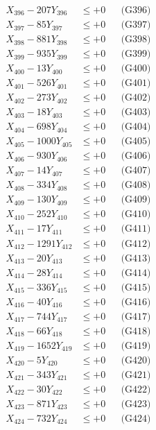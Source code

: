 \documentclass[a4paper,10pt]{article}
\begin{document}
{\begin{align}
X_{396} - 207Y_{396} &\leq +0 && \text{(G396)} \\
X_{397} - 85Y_{397} &\leq +0 && \text{(G397)} \\
X_{398} - 881Y_{398} &\leq +0 && \text{(G398)} \\
X_{399} - 935Y_{399} &\leq +0 && \text{(G399)} \\
X_{400} - 13Y_{400} &\leq +0 && \text{(G400)} \\
\allowbreak
X_{401} - 526Y_{401} &\leq +0 && \text{(G401)} \\
X_{402} - 273Y_{402} &\leq +0 && \text{(G402)} \\
X_{403} - 18Y_{403} &\leq +0 && \text{(G403)} \\
X_{404} - 698Y_{404} &\leq +0 && \text{(G404)} \\
X_{405} - 1000Y_{405} &\leq +0 && \text{(G405)} \\
X_{406} - 930Y_{406} &\leq +0 && \text{(G406)} \\
X_{407} - 14Y_{407} &\leq +0 && \text{(G407)} \\
X_{408} - 334Y_{408} &\leq +0 && \text{(G408)} \\
X_{409} - 130Y_{409} &\leq +0 && \text{(G409)} \\
X_{410} - 252Y_{410} &\leq +0 && \text{(G410)} \\
\allowbreak
X_{411} - 17Y_{411} &\leq +0 && \text{(G411)} \\
X_{412} - 1291Y_{412} &\leq +0 && \text{(G412)} \\
X_{413} - 20Y_{413} &\leq +0 && \text{(G413)} \\
X_{414} - 28Y_{414} &\leq +0 && \text{(G414)} \\
X_{415} - 336Y_{415} &\leq +0 && \text{(G415)} \\
X_{416} - 40Y_{416} &\leq +0 && \text{(G416)} \\
X_{417} - 744Y_{417} &\leq +0 && \text{(G417)} \\
X_{418} - 66Y_{418} &\leq +0 && \text{(G418)} \\
X_{419} - 1652Y_{419} &\leq +0 && \text{(G419)} \\
X_{420} - 5Y_{420} &\leq +0 && \text{(G420)} \\
\allowbreak
X_{421} - 343Y_{421} &\leq +0 && \text{(G421)} \\
X_{422} - 30Y_{422} &\leq +0 && \text{(G422)} \\
X_{423} - 871Y_{423} &\leq +0 && \text{(G423)} \\
X_{424} - 732Y_{424} &\leq +0 && \text{(G424)} \\

\end{align}}
\end{document}
